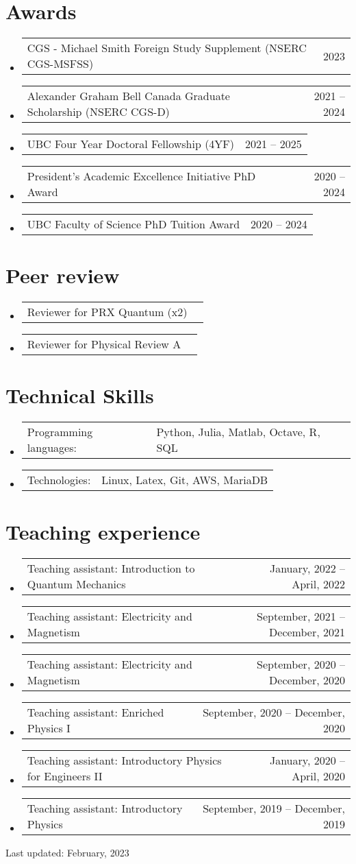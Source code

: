 \documentclass[letterpaper,11pt]{article}
\makeatletter
\newcommand{\TeachingItem}[2]{
	\item{\vspace{-1pt}
		\begin{tabular*}{0.92\textwidth}{l@{\extracolsep{\fill}}r}
			{#1} & {#2}
		\end{tabular*}
		\vspace{-5pt}
	}
}
\newcommand{\AwardsItem}[2]{
	\item{\vspace{-1pt}
		\begin{tabular*}{0.97\textwidth}{l@{\extracolsep{\fill}}r}
			{#1} & {#2}
		\end{tabular*}
		\vspace{-5pt}
	}
}
\newcommand{\SkillsItem}[2]{
	\item{\vspace{-1pt}
		\begin{tabular*}{0.97\textwidth}{l l}
			{#1:} & {#2}
		\end{tabular*}
		\vspace{-5pt}
	}
}
\makeatother
\begin{document}
\section*{Awards}
\begin{itemize}[leftmargin=*]
	\AwardsItem{CGS - Michael Smith Foreign Study Supplement (NSERC CGS-MSFSS)}{2023}
	\AwardsItem{Alexander Graham Bell Canada Graduate Scholarship (NSERC CGS-D)}{2021 -- 2024}
	\AwardsItem{UBC Four Year Doctoral Fellowship (4YF)}{2021 -- 2025}
	\AwardsItem{President's Academic Excellence Initiative PhD Award}{2020 -- 2024}
	\AwardsItem{UBC Faculty of Science PhD Tuition Award }{2020 -- 2024}
\end{itemize}

\section*{Peer review}
\begin{itemize}[leftmargin=*]
	\AwardsItem{Reviewer for PRX Quantum (x2)}{}
	\AwardsItem{Reviewer for Physical Review A}{}
\end{itemize}


\section*{Technical Skills}
\begin{itemize}[leftmargin=*]
	\SkillsItem{Programming languages}{Python, Julia, Matlab, Octave, R, SQL}
	\SkillsItem{Technologies}{Linux, Latex, Git, AWS, MariaDB}
\end{itemize}

\section*{Teaching experience}
\begin{itemize}[leftmargin=*]
	\TeachingItem{Teaching assistant: Introduction to Quantum Mechanics}{January, 2022 -- April, 2022}
	\TeachingItem{Teaching assistant: Electricity and Magnetism}{September, 2021 -- December, 2021}
	\TeachingItem{Teaching assistant: Electricity and Magnetism}{September, 2020 -- December, 2020}
	\TeachingItem{Teaching assistant: Enriched Physics I}{September, 2020 -- December, 2020}
	\TeachingItem{Teaching assistant: Introductory Physics for Engineers II}{January, 2020 -- April, 2020}
	\TeachingItem{Teaching assistant: Introductory Physics}{September, 2019 -- December, 2019}
\end{itemize}

\vspace{1cm}

\begin{flushright}
	Last updated: February, 2023
\end{flushright}
\end{document}
